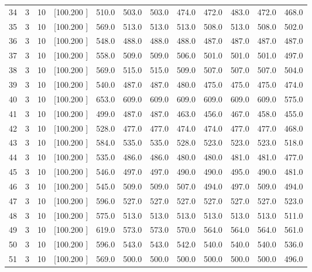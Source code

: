 \documentclass[12pt,a4paper]{article}
\begin{document}
\begin{center}
{\begin{tabular}{r r r r r r r r r r r r}
  34&  3& 10&[100.200   ]&   510.0&   503.0&   503.0&   474.0&   472.0&   483.0&   472.0&   468.0\\[-0.02in]
  35&  3& 10&[100.200   ]&   569.0&   513.0&   513.0&   513.0&   508.0&   513.0&   508.0&   502.0\\[-0.02in]
  36&  3& 10&[100.200   ]&   548.0&   488.0&   488.0&   488.0&   487.0&   487.0&   487.0&   487.0\\[-0.02in]
  37&  3& 10&[100.200   ]&   558.0&   509.0&   509.0&   506.0&   501.0&   501.0&   501.0&   497.0\\[-0.02in]
  38&  3& 10&[100.200   ]&   569.0&   515.0&   515.0&   509.0&   507.0&   507.0&   507.0&   504.0\\[-0.02in]
  39&  3& 10&[100.200   ]&   540.0&   487.0&   487.0&   480.0&   475.0&   475.0&   475.0&   474.0\\[-0.02in]
  40&  3& 10&[100.200   ]&   653.0&   609.0&   609.0&   609.0&   609.0&   609.0&   609.0&   575.0\\[-0.02in]
  41&  3& 10&[100.200   ]&   499.0&   487.0&   487.0&   463.0&   456.0&   467.0&   458.0&   455.0\\[-0.02in]
  42&  3& 10&[100.200   ]&   528.0&   477.0&   477.0&   474.0&   474.0&   477.0&   477.0&   468.0\\[-0.02in]
  43&  3& 10&[100.200   ]&   584.0&   535.0&   535.0&   528.0&   523.0&   523.0&   523.0&   518.0\\[-0.02in]
  44&  3& 10&[100.200   ]&   535.0&   486.0&   486.0&   480.0&   480.0&   481.0&   481.0&   477.0\\[-0.02in]
  45&  3& 10&[100.200   ]&   546.0&   497.0&   497.0&   490.0&   490.0&   495.0&   490.0&   481.0\\[-0.02in]
  46&  3& 10&[100.200   ]&   545.0&   509.0&   509.0&   507.0&   494.0&   497.0&   509.0&   494.0\\[-0.02in]
  47&  3& 10&[100.200   ]&   596.0&   527.0&   527.0&   527.0&   527.0&   527.0&   527.0&   523.0\\[-0.02in]
  48&  3& 10&[100.200   ]&   575.0&   513.0&   513.0&   513.0&   513.0&   513.0&   513.0&   511.0\\[-0.02in]
  49&  3& 10&[100.200   ]&   619.0&   573.0&   573.0&   570.0&   564.0&   564.0&   564.0&   561.0\\[-0.02in]
  50&  3& 10&[100.200   ]&   596.0&   543.0&   543.0&   542.0&   540.0&   540.0&   540.0&   536.0\\[-0.02in]
  51&  3& 10&[100.200   ]&   569.0&   500.0&   500.0&   500.0&   500.0&   500.0&   500.0&   496.0\\[-0.02in]

\end{tabular}}
\end{center}
\end{document}
